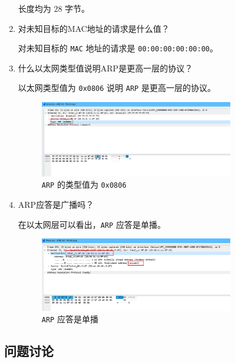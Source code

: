 \documentclass{article}
\begin{document}
\begin{enumerate}[noitemsep]
        长度均为 28 字节。
  \item 对未知目标的MAC地址的请求是什么值？

        对未知目标的 \texttt{MAC} 地址的请求是 \texttt{00:00:00:00:00:00}。
  \item 什么以太网类型值说明ARP是更高一层的协议？

        以太网类型值为 \texttt{0x0806} 说明 \texttt{ARP} 是更高一层的协议。

        \begin{figure}[H]
          \centering
          \includegraphics[width=0.8\textwidth]{img/8.png}
          \caption{\texttt{ARP} 的类型值为 \texttt{0x0806}}
          \label{fig:8}
        \end{figure}
  \item ARP应答是广播吗？

        在以太网层可以看出，\texttt{ARP} 应答是单播。

        \begin{figure}[H]
          \centering
          \includegraphics[width=0.8\textwidth]{img/9.png}
          \caption{\texttt{ARP} 应答是单播}
          \label{fig:9}
        \end{figure}

\end{enumerate}

\subsection{问题讨论}
\end{document}
